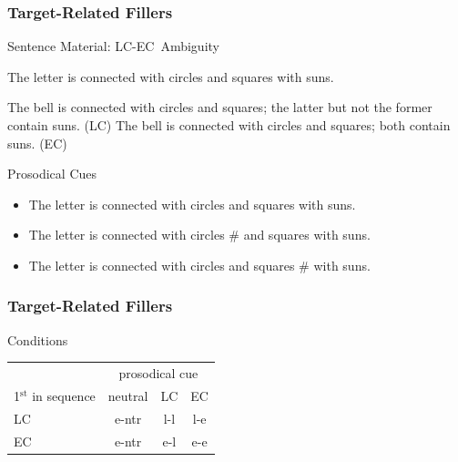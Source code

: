 \documentclass[fleqn,10pt,serif,xcolor=dvipsnames]{beamer}
\newcommand{\LC}{LC}
\newcommand{\EC}{EC}
\begin{document}
\begin{frame}
  \frametitle{Target-Related Fillers}
  \begin{block}{Sentence Material: \LC-\EC\ Ambiguity}
    \begin{exe}
      \ex The letter is connected with circles and squares with
        suns.
        \begin{xlist}
          \ex The bell is connected with circles and squares; the latter
            but not the former contain suns. \hfill (\LC)
          \ex The bell is connected with circles and squares; both
            contain suns. \hfill (\EC)
        \end{xlist}
    \end{exe}
  \end{block}

  \begin{block}{Prosodical Cues}
    \begin{itemize}
      \item[ntr:] The letter is connected with circles and squares with
        suns.
      \item[LC:] The letter is connected with circles \# and squares with
        suns.
      \item[EC:] The letter is connected with circles and squares \# with
        suns.
    \end{itemize}
    
  \end{block}

\end{frame}

\begin{frame}
  \frametitle{Target-Related Fillers}
  \begin{block}{Conditions}
    \begin{center}

      \begin{tabular}{lccc}
        & \multicolumn{3}{c}{prosodical cue} \\ \cmidrule(r){2-4}
        1$^{\mathrm{st}}$ in sequence & neutral & \LC & \EC \\ \midrule
        \LC & e-ntr & l-l & l-e \\
        \EC & e-ntr & e-l & e-e \\
      \end{tabular}

    \end{center}
  \end{block}
\end{frame}
\end{document}
